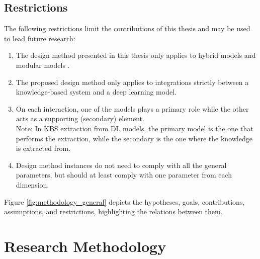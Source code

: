\subsection{Restrictions}
The following restrictions limit the contributions of this thesis and may be used to lead future research:
\begin{enumerate}[start=1,label={\bfseries R\arabic*:}]
    \item The design method presented in this thesis only applies to hybrid models \citep{hilario_overview_nodate} and modular models \citep{mcgarry_hybrid_1999}.
    \item The proposed design method only applies to integrations strictly between a knowledge-based system and a deep learning model. 
    \item On each interaction, one of the models plays a primary role while the other acts as a supporting (secondary) element.\\
    Note: In KBS extraction from DL models, the primary model is the one that performs the extraction, while the secondary is the one where the knowledge is extracted from.
    \item Design method instances do not need to comply with all the general parameters, but should at least comply with one parameter from each dimension. 
\end{enumerate}

Figure \ref{fig:methodology_general} depicts the hypotheses, goals, contributions, assumptions, and restrictions, highlighting the relations between them. 

\section{Research Methodology}\label{3_sec:research_methodology}

